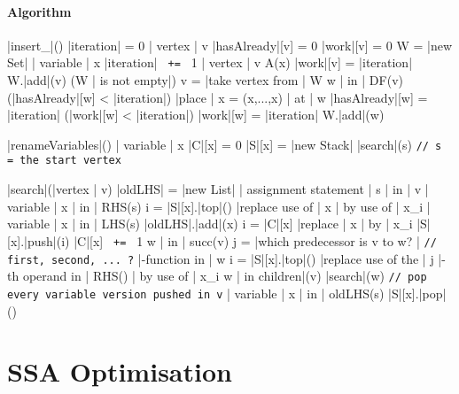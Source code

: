 \documentclass[a4paper,12pt, notitlepage]{article}
\newcommand{\negv}{\vspace{-0.7cm}}
\begin{document}
\paragraph*{Algorithm}
\begin{program}
\PROC |insert_|\phi() \BODY
    |iteration| = 0
    \FOREACH | vertex | v \DO
        |hasAlready|[v] = 0
        |work|[v] = 0
    \OD
    W = |new Set|
    \FOREACH | variable | x \DO
        |iteration| \texttt{ += } 1
        \FOREACH | vertex | v \in A(x) \DO
            |work|[v] = |iteration|
            W.|add|(v)
        \OD
        \WHILE (W | is not empty|) \DO 
            v = |take vertex from | W
            \FOREACH w | in | DF(v) \DO
                \IF (|hasAlready|[w] < |iteration|) \AR*
                    |place | x = \phi(x,...,x) | at | w
                    |hasAlready|[w] = |iteration|
                    \IF (|work|[w] < |iteration|) \AR*
                        |work|[w] = |iteration|
                        W.|add|(w)
                    \FI
                \FI
            \OD
        \OD
    \OD
\end{program}
\negv
\begin{program}
\PROC |renameVariables|() \BODY
    \FOREACH | variable | x \DO
        |C|[x] = 0
        |S|[x] = |new Stack|
    \OD
    |search|(s) \hspace{1cm} \texttt{// s = the start vertex}
\end{program}
\pagebreak
\begin{program}
\PROC |search|(|vertex | v) \BODY
    |oldLHS| = |new List|
    \FOREACH | assignment statement | s | in | v \DO
        \FOREACH | variable | x | in | RHS(s) \DO
            i = |S|[x].|top|()
            |replace use of | x | by use of | x_i
        \OD
        \FOREACH | variable | x | in | LHS(s) \DO
            |oldLHS|.|add|(x)
            i = |C|[x]
            |replace | x | by | x_i
            |S|[x].|push|(i)
            |C|[x] \texttt{ += } 1
        \OD
    \OD
    \FOREACH w | in | succ(v) \DO
        j = |which predecessor is v to w? | \hspace{1cm} \texttt{// first, second, ... ?}
        \FOREACH \phi|-function in | w \DO
            i = |S|[x].|top|()
            |replace use of the | j |-th operand in | RHS(\phi) | by use of | x_i
        \OD
    \OD
    \FOREACH w | in children|(v) \DO
        |search|(w)
    \texttt{// pop every variable version pushed in v}
    \FOREACH | variable | x | in | oldLHS(s) \DO
        |S|[x].|pop|()
    \OD
\end{program}
\section*{SSA Optimisation}
\end{document}
